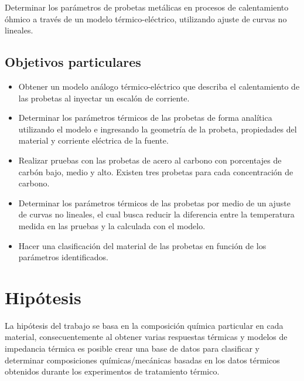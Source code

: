Determinar los parámetros 
de probetas metálicas en procesos de calentamiento óhmico a través de un modelo térmico-eléctrico, utilizando ajuste de curvas no lineales.


\subsection{Objetivos particulares}
\begin{itemize} 
	\item Obtener un modelo análogo térmico-eléctrico que describa el calentamiento de las probetas al inyectar un escalón de corriente.
	\item Determinar los parámetros térmicos de las probetas de forma analítica utilizando el modelo e ingresando la geometría de la probeta, propiedades del material y corriente eléctrica de la fuente.
	\item Realizar pruebas con las probetas de acero al carbono con porcentajes de carbón bajo, medio y alto. Existen tres probetas para cada concentración de carbono.
	\item Determinar los parámetros térmicos de las probetas por medio de un ajuste de curvas no lineales, el cual busca reducir la diferencia entre la temperatura medida en las pruebas y la calculada con el modelo. 
	\item Hacer una clasificación del material de las probetas en función de los parámetros identificados.
	
	
	
\end{itemize}

\section{Hipótesis}
La hipótesis del trabajo
se basa en la composición química particular en
cada material, consecuentemente al obtener varias respuestas
térmicas y modelos de impedancia térmica es posible crear una base
de datos para clasificar y determinar composiciones
químicas/mecánicas basadas en los datos térmicos
obtenidos durante los experimentos de tratamiento
térmico.


